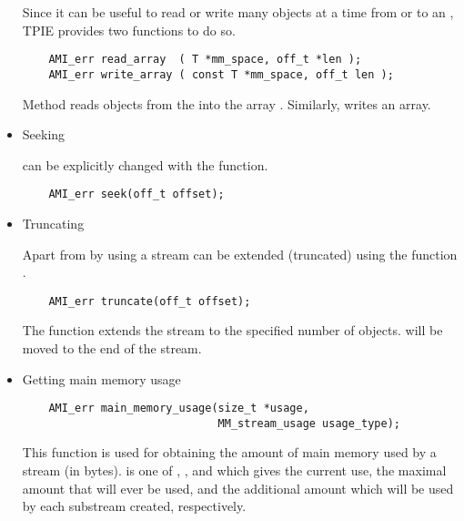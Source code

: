 \begin{itemize}
Since it can be useful to read or write many objects at a time from or to
an , TPIE provides two functions to do so.

\begin{verbatim}
    AMI_err read_array  ( T *mm_space, off_t *len );
    AMI_err write_array ( const T *mm_space, off_t len );
\end{verbatim}

Method  reads  objects from
the  into the array
. Similarly,  writes
an array. 

\item{Seeking}

 can be explicitly changed with the  function.

\begin{verbatim}
    AMI_err seek(off_t offset);
\end{verbatim}

\item{Truncating}

Apart from by using  a stream can be extended
(truncated) using the function .

\begin{verbatim}
    AMI_err truncate(off_t offset);
\end{verbatim}
The function extends the stream to the specified number of
objects.  will be moved to the end of the stream.

\item{Getting main memory usage}

\begin{verbatim}
    AMI_err main_memory_usage(size_t *usage,
                              MM_stream_usage usage_type);
\end{verbatim}

This function is used for obtaining the amount of main memory used by a
stream (in bytes).  is one of
, , and
 which gives the current use, the maximal
amount that will ever be used, and the additional amount which will be used
by each substream created, respectively.


\end{itemize}
